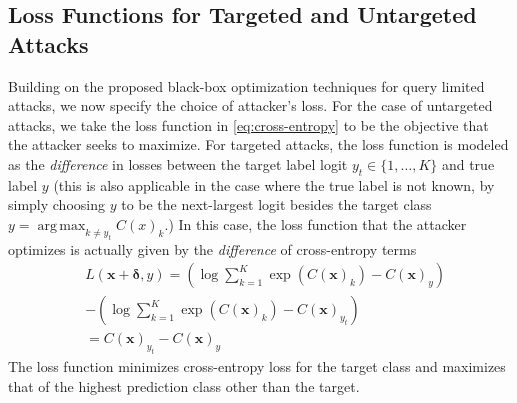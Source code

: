 \documentclass[letterpaper]{article}
\DeclareMathOperator*{\argmax}{arg\,max}
\begin{document}
	\subsection{Loss Functions for Targeted and Untargeted Attacks}
	Building on the proposed black-box optimization techniques for query limited attacks, we now specify the choice of attacker's loss. For the case of untargeted attacks, we take the loss function in \eqref{eq:cross-entropy} to be the objective that the attacker seeks to maximize. 
	For targeted attacks, the loss function is modeled as the \emph{difference} in losses between the target label logit $y_t \in \{1,\ldots,K\}$ and true label $y$ (this is also applicable in the case where the true label is not known, by simply choosing $y$ to be the next-largest logit besides the target class $y = \argmax_{k \neq y_t} C(x)_k$.) In this case, the loss function that the attacker optimizes is actually given by the \emph{difference} of cross-entropy terms
	{\small \begin{align}
		\label{eq:t_attack}
		&L(\mathbf{x}+\boldsymbol{\delta}, y)  =  
		\left ( \log\sum_{k=1}^K \exp(C(\mathbf{x})_k) - C(\mathbf{x})_{y} \right )\nonumber\\&- \left ( \log\sum_{k=1}^K \exp(C(\mathbf{x})_k) - C(\mathbf{x})_{y_t}  \right )\nonumber \\ &= C(\mathbf{x})_{y_t} -  C(\mathbf{x})_{y}
		\end{align}}
	The loss function minimizes cross-entropy loss for the target class and maximizes that of the highest prediction class other than the target.
	
\end{document}
